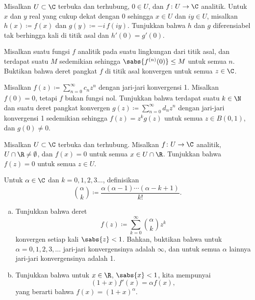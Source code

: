 \begin{exercise}
Misalkan $U \subset \C$ terbuka dan terhubung, $0 \in U$, dan $f \colon U
\to \C$ analitik.  Untuk $x$ dan $y$ real yang cukup dekat dengan $0$ sehingga
$x \in U$ dan $iy \in U$, misalkan $h(x) \coloneqq f(x)$ dan
$g(y) \coloneqq -i \, f(iy)$.
Tunjukkan bahwa $h$ dan $g$ diferensiabel tak berhingga kali di titik asal dan
$h'(0) = g'(0)$.
\end{exercise}

\begin{exercise}
Misalkan suatu fungsi $f$ analitik pada suatu lingkungan dari titik asal,
dan terdapat suatu $M$
sedemikian sehingga $\sabs{f^{(n)}(0)} \leq M$ untuk semua $n$.
Buktikan bahwa deret pangkat $f$ di titik asal konvergen untuk semua $z \in \C$.
\end{exercise}

\begin{exercise}
Misalkan $f(z) \coloneqq \sum_{n=0}^\infty c_n z^n$ dengan jari-jari konvergensi 1.  Misalkan $f(0)
= 0$, tetapi $f$ bukan fungsi nol.
Tunjukkan bahwa terdapat suatu $k \in \N$ dan suatu
deret pangkat konvergen $g(z) \coloneqq \sum_{n=0}^\infty d_n z^n$ dengan jari-jari konvergensi 1
sedemikian sehingga $f(z) = z^k g(z)$ untuk semua $z \in B(0,1)$, dan $g(0) \neq 0$.
\end{exercise}

\begin{exercise}
Misalkan $U \subset \C$ terbuka dan terhubung.  Misalkan
$f \colon U \to \C$ analitik, $U \cap \R \neq \emptyset$, dan
$f(x) = 0$ untuk semua $x \in U \cap \R$.  Tunjukkan bahwa $f(z) = 0$ untuk semua $z \in
U$.
\end{exercise}

\begin{exercise}
Untuk $\alpha \in \C$ dan $k=0,1,2,3\ldots$, definisikan
\begin{equation*}
\binom{\alpha}{k} \coloneqq \frac{\alpha(\alpha-1)\cdots(\alpha-k+1)}{k!} .
\end{equation*}
\begin{enumerate}[a)]
\item
Tunjukkan bahwa deret
\begin{equation*}
f(z) \coloneqq \sum_{k=0}^\infty \binom{\alpha}{k} z^k
\end{equation*}
konvergen setiap kali $\sabs{z} < 1$.
Bahkan, buktikan bahwa untuk $\alpha = 0,1,2,3,\ldots$ jari-jari
konvergensinya adalah $\infty$, dan untuk semua $\alpha$ lainnya
jari-jari konvergensinya adalah 1.
\item
Tunjukkan bahwa untuk $x \in \R$, $\sabs{x} < 1$, kita mempunyai
\begin{equation*}
(1+x) f'(x) = \alpha f(x) ,
\end{equation*}
yang berarti bahwa $f(x) = (1+x)^\alpha$.
\end{enumerate}
\end{exercise}

